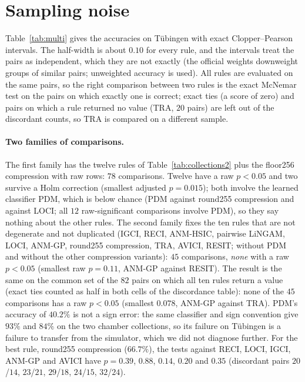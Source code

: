 \section{Sampling noise}\label{sec:noise}

Table~\ref{tab:multi} gives the accuracies on T\"ubingen with exact Clopper--Pearson intervals. The half-width is about $0.10$ for every rule, and the intervals treat the pairs as independent, which they are not exactly (the official weights downweight groups of similar pairs; unweighted accuracy is used). All rules are evaluated on the same pairs, so the right comparison between two rules is the exact McNemar test on the pairs on which exactly one is correct; exact ties (a score of zero) and pairs on which a rule returned no value (TRA, $20$ pairs) are left out of the discordant counts, so TRA is compared on a different sample.

\paragraph{Two families of comparisons.} The first family has the twelve rules of Table~\ref{tab:collections2} plus the floor256 compression with raw rows: $78$ comparisons. Twelve have a raw $p<0.05$ and two survive a Holm correction (smallest adjusted $p=0.015$); both involve the learned classifier PDM, which is below chance (PDM against round255 compression and against LOCI; all $12$ raw-significant comparisons involve PDM), so they say nothing about the other rules. The second family fixes the ten rules that are not degenerate and not duplicated (IGCI, RECI, ANM-HSIC, pairwise LiNGAM, LOCI, ANM-GP, round255 compression, TRA, AVICI, RESIT; without PDM and without the other compression variants): $45$ comparisons, \emph{none} with a raw $p<0.05$ (smallest raw $p=0.11$, ANM-GP against RESIT). The result is the same on the common set of the $82$ pairs on which all ten rules return a value (exact ties counted as half in both cells of the discordance table): none of the $45$ comparisons has a raw $p<0.05$ (smallest $0.078$, ANM-GP against TRA). PDM's accuracy of $40.2\%$ is not a sign error: the same classifier and sign convention give $93\%$ and $84\%$ on the two chamber collections, so its failure on T\"ubingen is a failure to transfer from the simulator, which we did not diagnose further. For the best rule, round255 compression ($66.7\%$), the tests against RECI, LOCI, IGCI, ANM-GP and AVICI have $p=0.39$, $0.88$, $0.14$, $0.20$ and $0.35$ (discordant pairs $20$/$14$, $23$/$21$, $29$/$18$, $24$/$15$, $32$/$24$).

